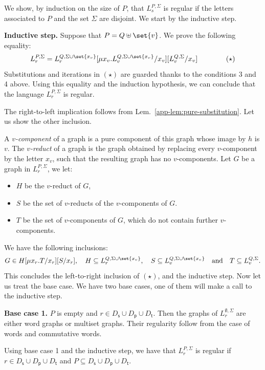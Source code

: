 \noindent We show, by induction on the size of $P$, that $L^{P, \Sigma}_s$ is regular  if  the letters associated to $P$ and the set $\Sigma$ are disjoint. We start by the inductive step.
\smallskip

 \noindent \textbf{Inductive step.} Suppose that $P=Q\uplus \set{v}$. We prove the following equality:
$$L^{P,\Sigma}_r=L^{Q,\Sigma\cup\set{x_v}}_r[\mu x_v. L^{Q,\Sigma\cup\set{x_v}}_v/x_v][L^{Q,\Sigma}_v/x_v] \qquad\qquad(\star) $$
Substitutions and iterations in $(\star)$ are guarded thanks to the conditions 3 and 4 above. 
Using this equality and the induction hypothesis, we can conclude that the language $L^{P,\Sigma}_r$ is regular. 


The right-to-left implication follows from Lem.~\ref{app-lem:pure-substitution}.  Let us show the other inclusion. 

\noindent A \emph{$v$-component} of a graph is a pure component of this graph whose image by $h$ is $v$.  The \emph{$v$-reduct} of a graph is the graph obtained by replacing every $v$-component by the letter $x_v$, such that the resulting graph has no $v$-components.  Let $G$ be a graph in  $L^{P,\Sigma}_r$,  we let: 
\begin{itemize}
\item $H$ be the $v$-reduct of $G$,
\item $S$ be the set of $v$-reducts of the $v$-components of $G$.
\item $T$ be the set of $v$-components of $G$, which do not contain further $v$-components.
\end{itemize}
We have the following inclusions: 
$$G\in H[\mu x_r. T/x_r][S/x_r],\quad H\subseteq L^{Q,\Sigma\cup\set{x_v}}_r,\quad S\subseteq L^{Q,\Sigma\cup\set{x_v}}_v\ \  \text{ and }\ \ T\subseteq L^{Q,\Sigma}_v.$$
This concludes the left-to-right inclusion of $(\star)$, and  the inductive step. Now let us treat the base case.  We have two base cases, one of them will make a call to the inductive step. 
\medskip


 \noindent \textbf{Base case 1.} $P$ is empty and $r\in D_\mathsf{s}\cup D_\mathsf{p}\cup D_\mathsf{t}$. Then the graphs of $L^{\emptyset,\Sigma}_r$ are either word graphs or multiset graphs. Their regularity follow from the case of words and commutative words.
\medskip

\begin{observation}
Using base case 1 and the inductive step, we have that 
$L^{P,\Sigma}_r$ is regular if $r\in D_\mathsf{s}\cup D_\mathsf{p}\cup D_\mathsf{t}$ and $P\subseteq D_\mathsf{s}\cup D_\mathsf{p}\cup D_\mathsf{t}$. 
\end{observation}
\medskip

